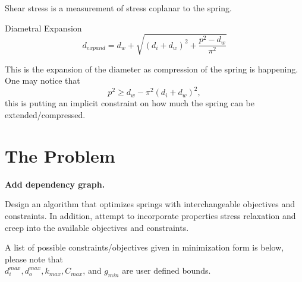 \documentclass[10pt]{article}
\begin{document}
				Shear stress is a measurement of stress coplanar to the spring. 
		
				Diametral Expansion\begin{equation} d_{expand} = d_{w} + \sqrt{(d_{i} + d_{w})^{2} + \frac{p^{2} - d_{w}}{\pi^{2}}}
			\end{equation}
			
			This is the expansion of the diameter as compression of the spring is happening. One may notice that \begin{equation}p^{2} \ge d_{w} - \pi^{2} (d_{i} + d_{w})^{2},\end{equation} this is putting an implicit constraint on how much the spring can be extended/compressed.
			
			
			
			
\section{The Problem} 
\label{sec:Problem}

\textbf{Add dependency graph.} 

Design an algorithm that optimizes springs with interchangeable objectives and constraints. In addition, attempt to incorporate properties stress relaxation and creep into the available objectives and constraints. 

A list of possible constraints/objectives given in minimization form is below, please note that \\$d_{i}^{max}, d_{o}^{max}, k_{max}, C_{max}$, and $g_{min}$ are user defined bounds. 
\end{document}
